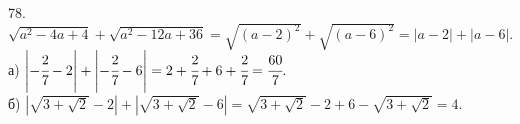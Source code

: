 78. $\sqrt{a^2-4a+4}+\sqrt{a^2-12a+36}=\sqrt{(a-2)^2}+\sqrt{(a-6)^2}=|a-2|+|a-6|.$\\
а) $\left|-\cfrac{2}{7}-2\right|+\left|-\cfrac{2}{7}-6\right|=2+\cfrac{2}{7}+6+\cfrac{2}{7}=\cfrac{60}{7}.$\\
б) $|\sqrt{3+\sqrt{2}}-2|+|\sqrt{3+\sqrt{2}}-6|=\sqrt{3+\sqrt{2}}-2+6-\sqrt{3+\sqrt{2}}=4.$\\
